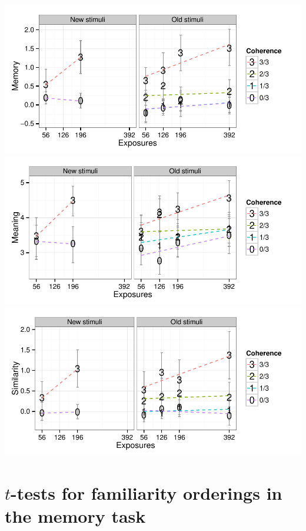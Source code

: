 \documentclass[man,floatsintext]{apa6}
\begin{document}
\begin{center}
\includegraphics[width=0.7\linewidth]{stim-comparison-mem} \\

\includegraphics[width=0.7\linewidth]{stim-comparison-mng} \\

\includegraphics[width=0.7\linewidth]{stim-comparison-sim}

\end{center}


\appendix
\section{$t$-tests for familiarity orderings in the memory task}
\end{document}
